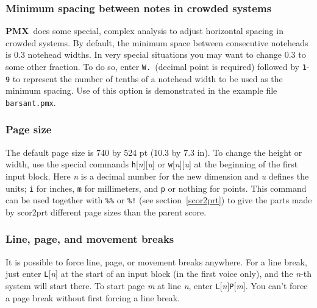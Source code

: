 \documentclass[11pt]{article}
\newcommand\PMXX{\textbf{PMX}}
\newcommand\PMX{\PMXX~}
\begin{document}
\subsubsection{Minimum spacing between notes in crowded systems}

	\PMX does some special, complex analysis to adjust horizontal spacing 
in crowded systems.  By default, the minimum space between consecutive 
noteheads is 0.3 notehead widths.  In very special situations you may want to 
change 0.3 to some other fraction. To do so, enter {\tt W. }(decimal point is required)
 followed by {\tt 1}-{\tt 9} to represent the number 
of tenths of a notehead width to be used as the minimum spacing. Use of this option 
is demonstrated in the example file {\tt barsant.pmx}.

\subsubsection{Page size}

	The default page size is 740 by 524 pt (10.3 by 7.3 in).  To change 
the height or width, use the special commands {\tt h}[{\it n}][{\it u}] or 
{\tt w}[{\it n}][{\it u}] at 
the beginning of the first input block.  Here {\it n} is a decimal number 
for the new dimension and {\it u} defines the units; {\tt i} for inches, {\tt m} for 
millimeters, and {\tt p} or nothing for points.  This command can be used 
together with {\tt \%\%} or {\tt \%!} 
(see section~\ref{scor2prt}) to give the parts made by 
{\bfx scor2prt} different page sizes than the parent score.

\subsubsection{Line, page, and movement breaks} \label{movbrk}

	It is possible to force line, page, or movement breaks anywhere.  
For a line break, just enter {\tt L}[{\it n}] at 
the start of an input block (in the first voice only), and the {\it n}-th 
system will start there.  To start page {\it m} at line {\it n}, enter 
{\tt L}[{\it n}]{\tt P}[{\it m}].  You can't force a page break without 
first forcing a line break.
\end{document}
